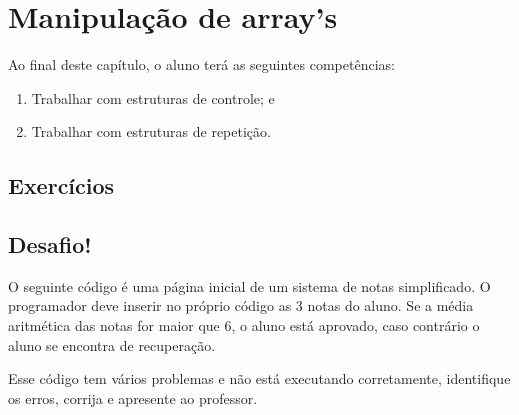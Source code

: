 \chapter{Manipulação de array's}
\label{manipulacao-de-arrays}

Ao final deste capítulo, o aluno terá as seguintes competências:
\begin{enumerate}
    \item Trabalhar com estruturas de controle; e 
    \item Trabalhar com estruturas de repetição.
\end{enumerate}

\section{Exercícios}
\label{cap6-exercicios}

\section{Desafio!}
\label{cap6-desafio}
O seguinte código é uma página inicial de um sistema de notas simplificado.
O programador deve inserir no próprio código as 3 notas do aluno. Se a média aritmética 
das notas for maior que 6, o aluno está aprovado, caso contrário o aluno se encontra de 
recuperação.

Esse código tem vários problemas e não está executando corretamente, identifique os erros, 
corrija e apresente ao professor.

